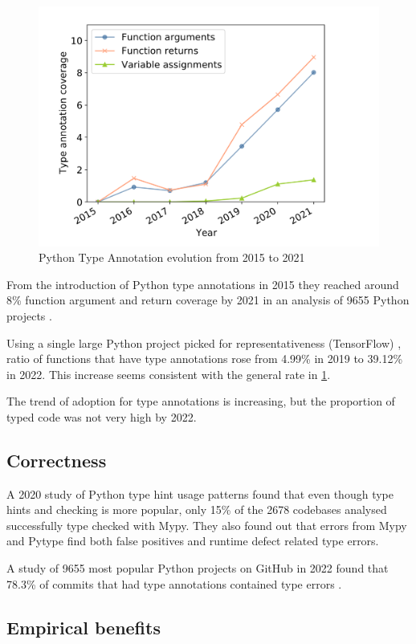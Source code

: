 \begin{figure}
    \centering
    \includegraphics[width=0.5\linewidth]{Screenshot 2024-12-05 at 15.37.59.png}
    \caption{Python Type Annotation evolution from 2015 to 2021 \cite{di_grazia_evolution_2022}}
    \label{fig:annotation-evolution}
\end{figure}
From the introduction of Python type annotations in 2015 they reached around 8\% function argument and return coverage by 2021 in an analysis of 9655 Python projects \cite{di_grazia_evolution_2022}. 

Using a single large Python project picked for representativeness (TensorFlow) \cite{lin_towards_large_scale_2023}, ratio of functions that have type annotations rose from 4.99\% in 2019 to 39.12\% in 2022. This increase seems consistent with the general rate in \ref{fig:annotation-evolution}.

The trend of adoption for type annotations is increasing, but the proportion of typed code was not very high by 2022.

\subsection{Correctness}

A 2020 study of Python type hint usage patterns \cite{rak-amnouykit_taleoftwo_2020} found that even though type hints and checking is more popular, only 15\% of the 2678 codebases analysed successfully type checked with Mypy. They also found out that errors from Mypy and Pytype find both false positives and runtime defect related type errors.

A study of 9655 most popular Python projects on GitHub in 2022 found that 78.3\% of commits that had type annotations contained type errors \cite{di_grazia_evolution_2022}.

\subsection{Empirical benefits}

